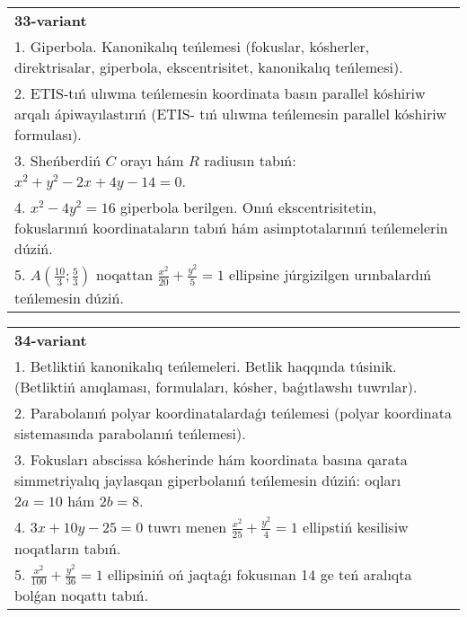 \documentclass{article}
\begin{document}
\begin{tabular}{m{17cm}}
\textbf{33-variant}\\
1. Giperbola. Kanonikalıq teńlemesi (fokuslar, kósherler, direktrisalar, giperbola, ekscentrisitet, kanonikalıq teńlemesi).\\

2. ETIS-tıń ulıwma teńlemesin koordinata basın parallel kóshiriw arqalı ápiwayılastırıń (ETIS- tıń ulıwma teńlemesin parallel kóshiriw formulası).\\

3. Sheńberdiń $C$ orayı hám $R$ radiusın tabıń: $x^2+y^2-2 x+4 y-14=0$.\\

4. $x^{2} - 4y^{2} = 16$ giperbola berilgen. Onıń ekscentrisitetin, fokuslarınıń koordinataların tabıń hám asimptotalarınıń teńlemelerin dúziń.\\

5. $A(\frac{10}{3};\frac{5}{3})$ noqattan $\frac{x^{2}}{20} + \frac{y^{2}}{5} = 1$ ellipsine júrgizilgen urınbalardıń teńlemesin dúziń.  
\end{tabular}
\vspace{1cm}


\begin{tabular}{m{17cm}}
\textbf{34-variant}\\
1. Betliktiń kanonikalıq teńlemeleri. Betlik haqqında túsinik. (Betliktiń anıqlaması, formulaları, kósher, baǵıtlawshı tuwrılar).\\

2. Parabolanıń polyar koordinatalardaǵı teńlemesi (polyar koordinata sistemasında parabolanıń teńlemesi).\\

3. Fokusları abscissa kósherinde hám koordinata basına qarata simmetriyalıq jaylasqan giperbolanıń teńlemesin dúziń: oqları $2 a=10$ hám $2 b=8$.\\

4. $3x + 10y - 25 = 0$ tuwrı menen $\frac{x^{2}}{25} + \frac{y^{2}}{4} = 1$ ellipstiń kesilisiw noqatların tabıń.\\

5. $\frac{x^{2}}{100} + \frac{y^{2}}{36} = 1$ ellipsiniń oń jaqtaǵı fokusınan 14 ge teń aralıqta bolǵan noqattı tabıń.  
\end{tabular}
\vspace{1cm}
\end{document}
